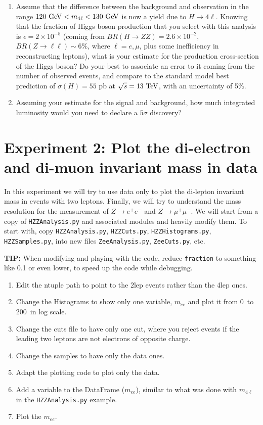 \begin{enumerate}[resume]

\item Assume that the difference between the background and observation in the range  $120\ \text{Ge\kern -0.1em V} < m_{4\ell} < 130\ \text{Ge\kern -0.1em V}$ is now a yield due to $H \rightarrow 4\ell$. Knowing that the fraction of Higgs boson production that you select with this analysis is $\epsilon = 2 \times 10^{-5}$ (coming from $BR(H\rightarrow ZZ)=2.6\times 10^{-2}$, $BR(Z\rightarrow \ell\ell) \sim 6\%$, where $\ell = e, \mu$, plus some inefficiency in reconstructing leptons), what is your estimate for the production cross-section of the Higgs boson? Do your best to associate an error to it coming from the number of observed events, and compare to the standard model best prediction of $\sigma(H) = 55$ pb at $\sqrt{s} = 13\ \text{Te\kern -0.1em V}$, with an uncertainty of 5\%. 
\item Assuming your estimate for the signal and background, how much integrated luminosity would you need to declare a $5\sigma$ discovery?
\end{enumerate}

\section{Experiment 2: Plot the di-electron and di-muon invariant mass in data}

In this experiment we will try to use data only to plot the di-lepton invariant mass in events with two leptons. Finally, we will try to understand the mass resolution for the measurement of $Z\rightarrow e^+e^-$ and $Z\rightarrow \mu^+\mu^-$. We will start from a copy of \verb|HZZAnalysis.py| and associated modules and heavily modify them. To start with, copy \verb|HZZAnalysis.py|, \verb|HZZCuts.py|, \verb|HZZHistograms.py|, \verb|HZZSamples.py|, into new files \verb|ZeeAnalysis.py|, \verb|ZeeCuts.py|, etc. 

\begin{remark}
\textbf{TIP:} When modifying and playing with the code, reduce \verb|fraction| to something like 0.1 or even lower, to speed up the code while debugging.
\end{remark}


\begin{enumerate} 
\item Edit the ntuple path to point to the 2lep events rather than the 4lep ones. 
\item Change the Histograms to show only one variable, $m_{ee}$ and plot it from 0\ \GeV to 200\ \GeV in log scale. 
\item Change the cuts file to have only one cut, where you reject events if the leading two leptons are not electrons of opposite charge. 
\item Change the samples to have only the data ones. 
\item Adapt the plotting code to plot only the data. 
\item Add a variable to the DataFrame ($m_{ee}$), similar to what was done with $m_{4\ell}$ in the \verb|HZZAnalysis.py| example.
\item Plot the $m_{ee}$. 
\end{enumerate}

